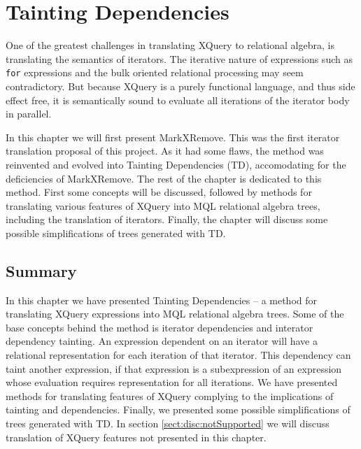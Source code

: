 \chapter{Tainting Dependencies}
\label{sect:translation}
\label{chapter:translation}


One of the greatest challenges in translating XQuery to relational algebra, is translating the semantics of
iterators. The iterative nature of expressions such as \texttt{for} expressions and the bulk oriented relational
processing may seem contradictory. But because XQuery is a purely functional language, and thus side effect free,
it is semantically sound to evaluate all iterations of the iterator body in
parallel.

In this chapter we will first present MarkXRemove. This was the first iterator translation proposal of this
project. As it had some flaws, the method was reinvented and evolved into Tainting Dependencies (TD), accomodating
for the deficiencies of MarkXRemove. The rest of the chapter is dedicated to this method. First some concepts will
be discussed, followed by methods for translating various features of XQuery into MQL relational algebra trees,
including the translation of iterators. Finally, the chapter will discuss some possible simplifications of trees
generated with TD.













\section{Summary}
\label{sect:trans:summary}

In this chapter we have presented Tainting Dependencies -- a method for
translating XQuery expressions into MQL relational algebra trees. Some of the
base concepts behind the method is iterator dependencies and interator dependency tainting. An expression dependent
on an iterator will have a relational representation for each iteration of that iterator. This
dependency can taint another expression, if that expression is a subexpression
of an expression whose evaluation requires representation for all iterations.
We have presented methods for translating features of XQuery complying to the
implications of tainting and dependencies. Finally, we presented some possible
simplifications of trees generated with TD. In section
\ref{sect:disc:notSupported} we will discuss translation of XQuery features
not presented in this chapter.
